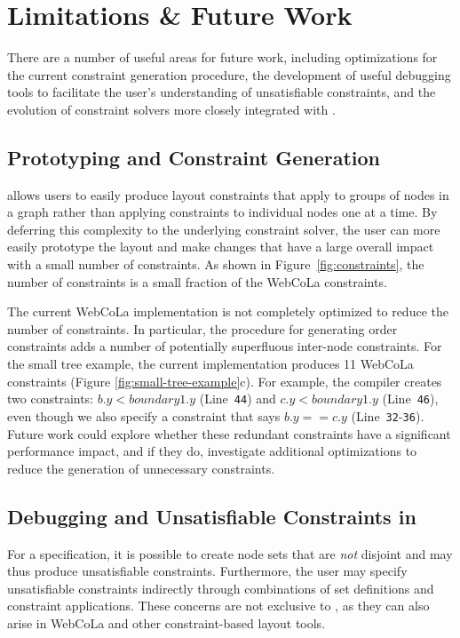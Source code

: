 \section{Limitations \& Future Work}
There are a number of useful areas for future work, including optimizations
for the current constraint generation procedure, the development of useful debugging
tools to facilitate the user's understanding of unsatisfiable constraints,
and the evolution of constraint solvers more closely integrated with \projectname.


\subsection{Prototyping and Constraint Generation}
\projectname allows users to easily produce layout constraints that apply
to groups of nodes in a graph rather than applying constraints to individual
nodes one at a time. By deferring this complexity to the underlying constraint
solver, the user can more easily prototype the layout and make changes that
have a large overall impact with a small number of constraints.
As shown in Figure~\ref{fig:constraints},
the number of \projectname constraints is a small fraction of the WebCoLa constraints.

The current WebCoLa implementation is not completely optimized to reduce the
number of constraints. In particular, the procedure for generating
order constraints adds a number of potentially superfluous inter-node 
constraints. For the small tree example, the current \projectname implementation 
produces 11 WebCoLa constraints (Figure \ref{fig:small-tree-example}c). For example,
the \projectname compiler creates two constraints: $b.y < boundary1.y$ (Line~\texttt{44}) 
and $c.y < boundary1.y$ (Line~\texttt{46}), even though we also specify
a constraint that says $b.y == c.y$ (Line~\texttt{32}-\texttt{36}). 
Future work could explore whether these redundant constraints have a 
significant performance impact, and if they do, investigate additional 
optimizations to reduce the generation of unnecessary constraints.

\subsection{Debugging and Unsatisfiable Constraints in \projectname}
For a \projectname specification, it is possible to create node sets that
are \emph{not} disjoint and may thus produce unsatisfiable constraints. Furthermore, 
the user may specify unsatisfiable constraints indirectly through
combinations of set definitions and constraint applications. These concerns
are not exclusive to \projectname, as they can also arise
in WebCoLa and other constraint-based layout tools.

